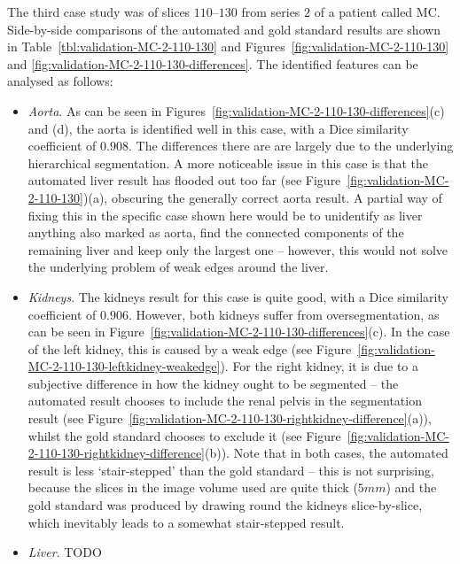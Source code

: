 \fi

The third case study was of slices $110$--$130$ from series $2$ of a patient called MC. Side-by-side comparisons of the automated and gold standard results are shown in Table~\ref{tbl:validation-MC-2-110-130} and Figures~\ref{fig:validation-MC-2-110-130} and \ref{fig:validation-MC-2-110-130-differences}. The identified features can be analysed as follows:
%
\begin{itemize}

\item \emph{Aorta}. As can be seen in Figures~\ref{fig:validation-MC-2-110-130-differences}(c) and (d), the aorta is identified well in this case, with a Dice similarity coefficient of $0.908$. The differences there are are largely due to the underlying hierarchical segmentation. A more noticeable issue in this case is that the automated liver result has flooded out too far (see Figure~\ref{fig:validation-MC-2-110-130})(a), obscuring the generally correct aorta result. A partial way of fixing this in the specific case shown here would be to unidentify as liver anything also marked as aorta, find the connected components of the remaining liver and keep only the largest one -- however, this would not solve the underlying problem of weak edges around the liver.

\item \emph{Kidneys}. The kidneys result for this case is quite good, with a Dice similarity coefficient of $0.906$. However, both kidneys suffer from oversegmentation, as can be seen in Figure~\ref{fig:validation-MC-2-110-130-differences}(c). In the case of the left kidney, this is caused by a weak edge (see Figure~\ref{fig:validation-MC-2-110-130-leftkidney-weakedge}). For the right kidney, it is due to a subjective difference in how the kidney ought to be segmented -- the automated result chooses to include the renal pelvis in the segmentation result (see Figure~\ref{fig:validation-MC-2-110-130-rightkidney-difference}(a)), whilst the gold standard chooses to exclude it (see Figure~\ref{fig:validation-MC-2-110-130-rightkidney-difference}(b)). Note that in both cases, the automated result is less `stair-stepped' than the gold standard -- this is not surprising, because the slices in the image volume used are quite thick ($5\mathit{mm}$) and the gold standard was produced by drawing round the kidneys slice-by-slice, which inevitably leads to a somewhat stair-stepped result.

\item \emph{Liver}. TODO


\end{itemize}
